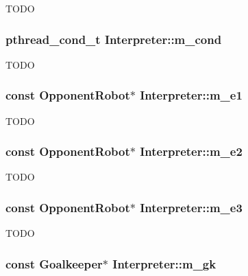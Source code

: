 \label{classInterpreter_a734c73b13d471eb10d9a0ce772ffd906}
TODO \hypertarget{classInterpreter_a9239b5f00f922f05a3902538784f5777}{
\subsubsection[{m\_\-cond}]{\setlength{\rightskip}{0pt plus 5cm}pthread\_\-cond\_\-t {\bf Interpreter::m\_\-cond}}}
\label{classInterpreter_a9239b5f00f922f05a3902538784f5777}
TODO \hypertarget{classInterpreter_a373544ccef8dc7630108349b589cee3d}{
\subsubsection[{m\_\-e1}]{\setlength{\rightskip}{0pt plus 5cm}const {\bf OpponentRobot}$\ast$ {\bf Interpreter::m\_\-e1}}}
\label{classInterpreter_a373544ccef8dc7630108349b589cee3d}
TODO \hypertarget{classInterpreter_aa04c8b2059980f776ea43c6f5e8e734b}{
\subsubsection[{m\_\-e2}]{\setlength{\rightskip}{0pt plus 5cm}const {\bf OpponentRobot}$\ast$ {\bf Interpreter::m\_\-e2}}}
\label{classInterpreter_aa04c8b2059980f776ea43c6f5e8e734b}
TODO \hypertarget{classInterpreter_ab61a3f3a1896b2d0d886aadcd15d72c1}{
\subsubsection[{m\_\-e3}]{\setlength{\rightskip}{0pt plus 5cm}const {\bf OpponentRobot}$\ast$ {\bf Interpreter::m\_\-e3}}}
\label{classInterpreter_ab61a3f3a1896b2d0d886aadcd15d72c1}
TODO \hypertarget{classInterpreter_a5c100f5098dbea4f12c8e65524914891}{
\subsubsection[{m\_\-gk}]{\setlength{\rightskip}{0pt plus 5cm}const {\bf Goalkeeper}$\ast$ {\bf Interpreter::m\_\-gk}}}
